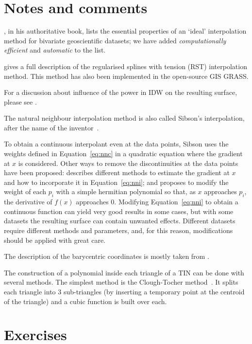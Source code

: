 %
\section{Notes and comments}


\citet{Watson92}, in his authoritative book, lists the essential properties of an `ideal' interpolation method for bivariate geoscientific datasets; we have added \emph{computationally efficient} and \emph{automatic} to the list.

\citet{Mitasova93} gives a full description of the regularised splines with tension (RST) interpolation method.
This method has also been implemented in the open-source GIS GRASS\@.

For a discussion about influence of the power in IDW on the resulting surface, please see \citet{Watson92}.

The natural neighbour interpolation method is also called Sibson's interpolation, after the name of the inventor~\citep{Sibson81}. 

To obtain a continuous interpolant even at the data points, Sibson uses the weights defined in Equation~\ref{eq:nnc} in a quadratic equation where the gradient at $x$ is considered. 
Other ways to remove the discontinuities at the data points have been proposed: \citet{Watson92} describes different methods to estimate the gradient at $x$ and how to incorporate it in Equation~\ref{eq:nni}; and \citet{Gold89} proposes to modify the weight of each $p_{i}$ with a simple hermitian polynomial so that, as $x$ approaches $p_{i}$, the derivative of $f(x)$ approaches 0. 
Modifying Equation~\ref{eq:nni} to obtain a continuous function can yield very good results in some cases, but with some datasets the resulting surface can contain unwanted effects.
Different datasets require different methods and parameters, and, for this reason, modifications should be applied with great care. 

The description of the barycentric coordinates is mostly taken from \citet{Eberly18}.

The construction of a polynomial inside each triangle of a TIN can be done with several methods. 
The simplest method is the Clough-Tocher method~\citep{Clough65,Farin85}.
It splits each triangle into 3 sub-triangles (by inserting a temporary point at the centroid of the triangle) and a cubic function is built over each.


%
\section{Exercises}

